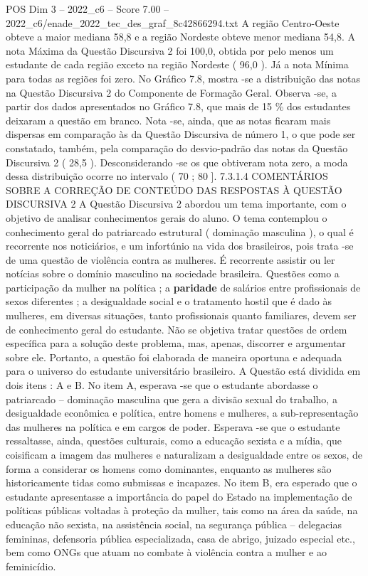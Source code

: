 \begin{textsample}{POS Dim 3 – 2022\_c6 – Score 7.00 – 2022\_c6/enade\_2022\_tec\_des\_graf\_8c42866294.txt}
A região Centro-Oeste obteve a maior mediana 58,8 e a região Nordeste obteve menor mediana 54,8.
A nota Máxima da Questão Discursiva 2 foi 100,0, obtida por pelo menos um estudante de cada região exceto na região Nordeste ( 96,0 ).
Já a nota Mínima para todas as regiões foi zero.
No Gráfico 7.8, mostra -se a distribuição das notas na Questão Discursiva 2 do Componente de Formação Geral.
Observa -se, a partir dos dados apresentados no Gráfico 7.8, que mais de 15 \% dos estudantes deixaram a questão em branco.
Nota -se, ainda, que as notas ficaram mais dispersas em comparação às da Questão Discursiva de número 1, o que pode ser constatado, também, pela comparação do desvio-padrão das notas da Questão Discursiva 2 ( 28,5 ).
Desconsiderando -se os que obtiveram nota zero, a moda dessa distribuição ocorre no intervalo ( 70 ; 80 ]. 7.3.1.4 COMENTÁRIOS SOBRE A CORREÇÃO DE CONTEÚDO DAS RESPOSTAS À QUESTÃO DISCURSIVA 2 A Questão Discursiva 2 abordou um tema importante, com o objetivo de analisar conhecimentos gerais do aluno.
O tema contemplou o conhecimento geral do patriarcado estrutural ( dominação masculina ), o qual é recorrente nos noticiários, e um infortúnio na vida dos brasileiros, pois trata -se de uma questão de violência contra as mulheres.
É recorrente assistir ou ler notícias sobre o domínio masculino na sociedade brasileira.
Questões como a participação da mulher na política ; a \textbf{paridade} de salários entre profissionais de sexos diferentes ; a desigualdade social e o tratamento hostil que é dado às mulheres, em diversas situações, tanto profissionais quanto familiares, devem ser de conhecimento geral do estudante.
Não se objetiva tratar questões de ordem específica para a solução deste problema, mas, apenas, discorrer e argumentar sobre ele.
Portanto, a questão foi elaborada de maneira oportuna e adequada para o universo do estudante universitário brasileiro.
A Questão está dividida em dois itens : A e B.
No item A, esperava -se que o estudante abordasse o patriarcado – dominação masculina que gera a divisão sexual do trabalho, a desigualdade econômica e política, entre homens e mulheres, a sub-representação das mulheres na política e em cargos de poder.
Esperava -se que o estudante ressaltasse, ainda, questões culturais, como a educação sexista e a mídia, que coisificam a imagem das mulheres e naturalizam a desigualdade entre os sexos, de forma a considerar os homens como dominantes, enquanto as mulheres são historicamente tidas como submissas e incapazes.
No item B, era esperado que o estudante apresentasse a importância do papel do Estado na implementação de políticas públicas voltadas à proteção da mulher, tais como na área da saúde, na educação não sexista, na assistência social, na segurança pública – delegacias femininas, defensoria pública especializada, casa de abrigo, juizado especial etc., bem como ONGs que atuam no combate à violência contra a mulher e ao feminicídio.

\end{textsample}
